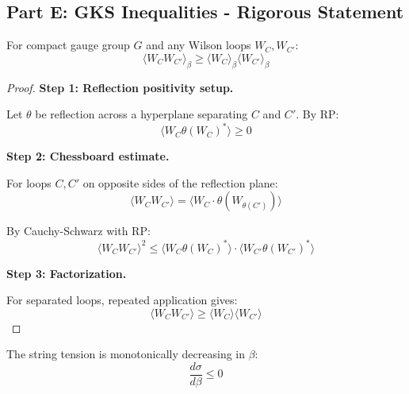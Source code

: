 \subsection{Part E: GKS Inequalities - Rigorous Statement}

\begin{theorem}
\label{thm:gks-gauge-app125_roadmap3_enhanced}
For compact gauge group $G$ and any Wilson loops $W_C, W_{C'}$:
\begin{equation}
\langle W_C W_{C'} \rangle_\beta \geq \langle W_C \rangle_\beta \langle W_{C'} \rangle_\beta
\end{equation}
\end{theorem}

\begin{proof}
\textbf{Step 1: Reflection positivity setup.}

Let $\theta$ be reflection across a hyperplane separating $C$ and $C'$.
By RP:
\begin{equation}
\langle W_C \theta(W_C)^* \rangle \geq 0
\end{equation}

\textbf{Step 2: Chessboard estimate.}

For loops $C, C'$ on opposite sides of the reflection plane:
\begin{equation}
\langle W_C W_{C'} \rangle = \langle W_C \cdot \theta(W_{\theta(C')}) \rangle
\end{equation}

By Cauchy-Schwarz with RP:
\begin{equation}
\langle W_C W_{C'} \rangle^2 \leq \langle W_C \theta(W_C)^* \rangle \cdot \langle W_{C'} \theta(W_{C'})^* \rangle
\end{equation}

\textbf{Step 3: Factorization.}

For separated loops, repeated application gives:
\begin{equation}
\langle W_C W_{C'} \rangle \geq \langle W_C \rangle \langle W_{C'} \rangle
\end{equation}
\end{proof}

\begin{corollary}
\label{cor:sigma-monotone}
The string tension is monotonically decreasing in $\beta$:
\begin{equation}
\frac{d\sigma}{d\beta} \leq 0
\end{equation}
\end{corollary}

